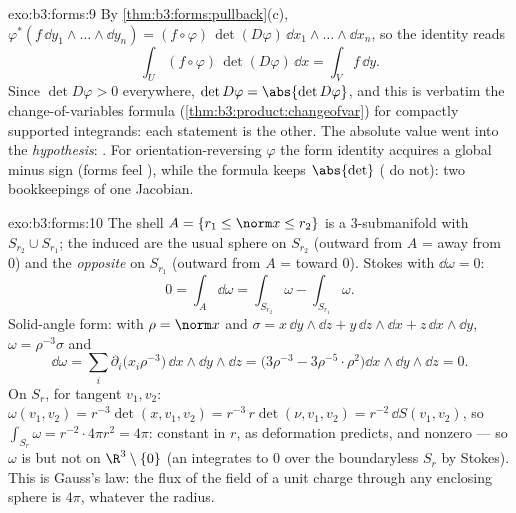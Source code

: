 \begin{solution}{exo:b3:forms:9}
By \cref{thm:b3:forms:pullback}(c),
$\varphi^*(f\,\dd y_1\wedge\dots\wedge\dd y_n) =
(f\circ\varphi)\,\det(D\varphi)\,\dd
x_1\wedge\dots\wedge\dd x_n$, so the  identity reads
\[
\int_U(f\circ\varphi)\,\det(D\varphi)\,\dd x = \int_Vf\,\dd
y .
\]
Since $\det D\varphi > 0$ everywhere, $\det D\varphi =
\abs{\det D\varphi}$, and this is verbatim the
change-of-variables formula
(\cref{thm:b3:product:changeofvar}) for 
compactly supported integrands: each statement is the
other. The absolute value went into the \emph{hypothesis}:
. For orientation-reversing $\varphi$ the form
identity acquires a global minus sign (forms feel
), while the  formula keeps $\abs{\det}$
( do not): two bookkeepings of one Jacobian.
\end{solution}

\begin{solution}{exo:b3:forms:10}
The shell $A = \{r_1 \leq \norm x \leq r_2\}$ is a 
$3$-submanifold with  $S_{r_2}\cup S_{r_1}$; the
induced  are the usual sphere  on
$S_{r_2}$ (outward from $A$ = away from $0$) and the
\emph{opposite} on $S_{r_1}$ (outward from $A$ = toward
$0$). Stokes with $\dd\omega = 0$:
\[
0 = \int_A\dd\omega = \int_{S_{r_2}}\omega -
\int_{S_{r_1}}\omega .
\]
Solid-angle form: with $\rho = \norm x$ and $\sigma =
x\,\dd y\wedge\dd z + y\,\dd z\wedge\dd x + z\,\dd
x\wedge\dd y$, $\omega = \rho^{-3}\sigma$ and
\[
\dd\omega = \sum_i\partial_i\bigl(x_i\rho^{-3}\bigr)\,
\dd x\wedge\dd y\wedge\dd z
= \bigl(3\rho^{-3} - 3\rho^{-5}\cdot\rho^2\bigr)\dd
x\wedge\dd y\wedge\dd z = 0 .
\]
On $S_r$, for tangent $v_1, v_2$: $\omega(v_1, v_2) =
r^{-3}\det(x, v_1, v_2) = r^{-3}\,r\det(\nu, v_1, v_2) =
r^{-2}\,\dd S(v_1, v_2)$, so $\int_{S_r}\omega =
r^{-2}\cdot4\pi r^2 = 4\pi$: constant in $r$, as deformation
predicts, and nonzero --- so $\omega$ is  but not
 on $\R^3\setminus\{0\}$ (an  integrates to
$0$ over the boundaryless $S_r$ by Stokes). This is Gauss's
law: the flux of the field of a unit charge through any
enclosing sphere is $4\pi$, whatever the radius.
\end{solution}

